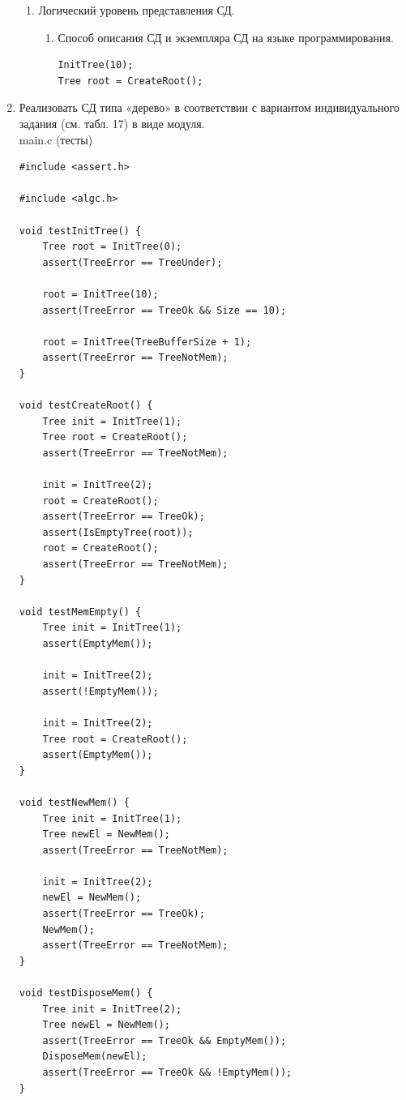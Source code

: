 \documentclass[a4paper,14pt]{extarticle}
\begin{document}
\begin{enumerate}
\begin{enumerate}[label*=\arabic*.]
		      \item Логический уровень представления СД.
		            \begin{enumerate}[label*=\arabic*.]
			            \item Способ описания СД и экземпляра СД на языке программирования.\\
						\begin{verbatim}
InitTree(10);
Tree root = CreateRoot();
												  \end{verbatim}
		            \end{enumerate}
	      \end{enumerate}
		  \item Реализовать СД типа «дерево» в соответствии с 
          вариантом индивидуального задания (см. табл. 17) в виде модуля.\\
main.c (тесты)
		  \begin{verbatim}
#include <assert.h>

#include <algc.h>

void testInitTree() {
    Tree root = InitTree(0);
    assert(TreeError == TreeUnder);

    root = InitTree(10);
    assert(TreeError == TreeOk && Size == 10);

    root = InitTree(TreeBufferSize + 1);
    assert(TreeError == TreeNotMem);
}

void testCreateRoot() {
    Tree init = InitTree(1);
    Tree root = CreateRoot();
    assert(TreeError == TreeNotMem);

    init = InitTree(2);
    root = CreateRoot();
    assert(TreeError == TreeOk);
    assert(IsEmptyTree(root));
    root = CreateRoot();
    assert(TreeError == TreeNotMem);
}

void testMemEmpty() {
    Tree init = InitTree(1);
    assert(EmptyMem());

    init = InitTree(2);
    assert(!EmptyMem());

    init = InitTree(2);
    Tree root = CreateRoot();
    assert(EmptyMem());
}

void testNewMem() {
    Tree init = InitTree(1);
    Tree newEl = NewMem();
    assert(TreeError == TreeNotMem);

    init = InitTree(2);
    newEl = NewMem();
    assert(TreeError == TreeOk);
    NewMem();
    assert(TreeError == TreeNotMem);
}

void testDisposeMem() {
    Tree init = InitTree(2);
    Tree newEl = NewMem();
    assert(TreeError == TreeOk && EmptyMem());
    DisposeMem(newEl);
    assert(TreeError == TreeOk && !EmptyMem());
}


\end{verbatim}
\end{enumerate}
\end{document}
